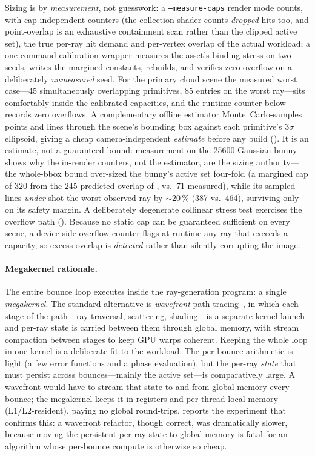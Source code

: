 Sizing is by \emph{measurement}, not guesswork: a \texttt{--measure-caps} render mode counts, with
cap-independent counters (the collection shader counts \emph{dropped} hits too, and point-overlap is
an exhaustive containment scan rather than the clipped active set), the true per-ray hit demand and
per-vertex overlap of the actual workload; a one-command calibration wrapper measures the asset's
binding stress on two seeds, writes the margined constants, rebuilds, and verifies zero overflow on a
deliberately \emph{unmeasured} seed. For the primary cloud scene the measured worst case---\num{45}
simultaneously overlapping primitives, \num{85} entries on the worst ray---sits comfortably inside
the calibrated capacities, and the runtime counter below records zero overflows. A complementary
offline estimator Monte~Carlo-samples points and lines through the scene's bounding box against each
primitive's $3\sigma$ ellipsoid, giving a cheap camera-independent \emph{estimate} before any build
(). It is an estimate, not a guaranteed bound: measurement on the \num{25600}-Gaussian
bunny shows why the in-render counters, not the estimator, are the sizing authority---the whole-bbox bound over-sized the bunny's active set
four-fold (a margined cap of \num{320} from the \num{245} predicted overlap of , vs.\
\num{71} measured), while its sampled lines \emph{under}-shot the
worst observed ray by ${\sim}20\,\%$ (\num{387} vs.\ \num{464}), surviving only on its safety margin.
A deliberately degenerate collinear stress test
exercises the overflow path (). Because no static cap can be guaranteed sufficient
on every scene, a device-side overflow counter flags at runtime any ray that exceeds a capacity, so
excess overlap is \emph{detected} rather than silently corrupting the image.

\paragraph{Megakernel rationale.} The entire bounce loop executes inside the ray-generation program: a
single \emph{megakernel}. The standard alternative is \emph{wavefront} path tracing~\cite{Laine2013},
in which each stage of the path---ray traversal, scattering, shading---is a separate kernel launch and
per-ray state is carried between them through global memory, with stream compaction between stages to
keep GPU warps coherent. Keeping the whole loop in one kernel is a deliberate fit to the workload. The per-bounce arithmetic is light (a few
error functions and a phase evaluation), but the per-ray \emph{state} that must persist across
bounces---mainly the active set---is comparatively large. A wavefront would have to stream that state
to and from global memory every bounce; the megakernel keeps it in registers and per-thread local memory
(L1/L2-resident), paying no global round-trips. \Cref{ch:optimization} reports the experiment that confirms this: a wavefront
refactor, though correct, was dramatically slower, because moving the persistent per-ray state to
global memory is fatal for an algorithm whose per-bounce compute is otherwise so cheap.


